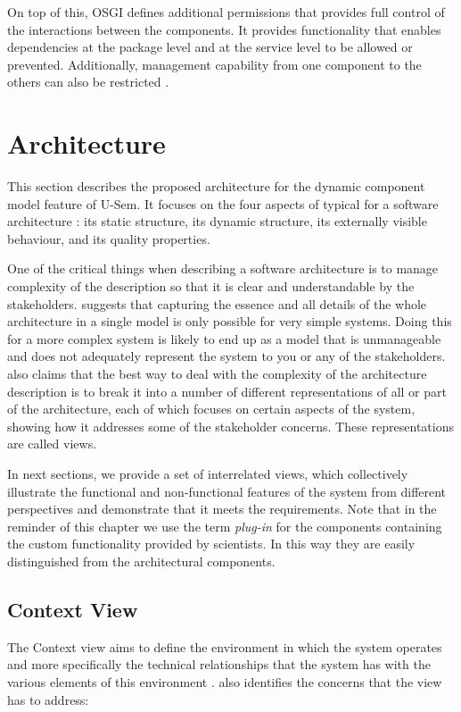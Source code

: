 On top of this, OSGI defines additional permissions that provides full control of the interactions between the components. It provides functionality that enables dependencies at the package level and at the service level to be allowed or prevented. Additionally, management capability from one component to the others can also be restricted \cite{Parrend}.


\section{Architecture}
\label{sec:architecture}

This section describes the proposed architecture for the dynamic component model feature of U-Sem. It focuses on the four aspects of typical for a software architecture \cite{Rozanski}: its static structure, its dynamic structure, its externally visible behaviour, and its quality properties.

One of the critical things when describing a software architecture is to manage complexity of the description so that it is clear and understandable by the stakeholders. \cite{Rozanski} suggests that capturing the essence and all details of the whole architecture in a single model is only possible for very simple systems. Doing this for a more complex system is likely to end up as a model that is unmanageable and does not adequately represent the system to you or any of the stakeholders. \cite{Rozanski} also claims that the best way to deal with the complexity of the architecture description is to break it into a number of different representations of all or part of the architecture, each of which focuses on certain aspects of the system, showing how it addresses some of the stakeholder concerns. These representations are called views.

In next sections, we provide a set of interrelated views, which collectively illustrate the functional and non-functional features of the system from different perspectives and demonstrate that it meets the requirements. Note that in the reminder of this chapter we use the term \textit{plug-in} for the components containing the custom functionality provided by scientists. In this way they are easily distinguished from the architectural components. 

\subsection{Context View}

The Context view aims to define the environment in which the system operates and more specifically the technical relationships that the system has with the various elements of this environment \cite{Woods}. \cite{Woods} also identifies the concerns that the view has to address:

